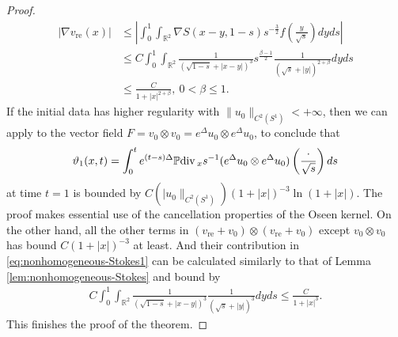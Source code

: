\documentclass[12pt]{amsart}
\renewcommand{\div}{{\rm div \thinspace }}
\numberwithin{equation}{section}              %
\theoremstyle{remark}
\begin{document}
\begin{proof}
			\begin{equation}\label{eq:decayofgradient}
				\begin{aligned}
					| \nabla v_{\textrm{re}}(x)| & \leq \left|\int_0^1 \int_{\mathbb{R}^2} \nabla S(x-y,1-s)  s^{-\frac{3}{2}} f\left(\frac{y}{\sqrt{s}}\right)  dy ds\right|\\
					&\leq C \int_0^1 \int_{\mathbb{R}^2}\frac{1}{(\sqrt{1-s}+|x-y|)^3} s^{\frac{\beta-1}{2}}\frac{1}{(\sqrt{s}+|y|)^{2+\beta}} dy ds\\
					& \leq \frac{C}{1+|x|^{2+\beta}}, ~ 0<\beta \leq 1.
				\end{aligned}						
			\end{equation}
			If the initial data has higher regularity with $\|u_0\|_{C^2(S^1)}<+\infty$, then
			we can apply \cite[Lemma 4]{Brandolese09} to the vector field $F=v_0\otimes v_0= e^{\Delta}u_0\otimes e^{\Delta}u_0$, to  conclude that
			\begin{equation*}
				\vartheta_1(x,t) = \int_0^t   e^{(t-s)\Delta} \mathbb{P} \div_x s^{-1} (e^{\Delta}u_0\otimes e^{\Delta}u_0)\left(\frac{\cdot}{\sqrt{s}}\right) ds
			\end{equation*}
			at time $t=1$	is bounded by $C(|u_0\|_{C^2(S^1)})(1+|x|)^{-3}\ln(1+|x|)$. The proof  makes essential use of the cancellation properties of the Oseen kernel.
			On the other hand, all the other terms in $(v_{\textrm{re}} + v_0)\otimes(v_{\textrm{re}} + v_0)$ except $v_0\otimes v_0$ has bound $C(1+|x|)^{-3}$ at least. And their contribution in \eqref{eq:nonhomogeneous-Stokes1} can be calculated similarly to that of Lemma \ref{lem:nonhomogeneous-Stokes} and bound by 
			\begin{equation*}
				\begin{aligned}
					C \int_0^1 \int_{\mathbb{R}^2}\frac{1}{(\sqrt{1-s}+|x-y|)^3} \frac{1}{(\sqrt{s}+|y|)^3} dy ds
					\leq \frac{C}{1+|x|^3}.
				\end{aligned}						
			\end{equation*}
            This finishes the proof of the theorem.
		\end{proof}
		
		
		
		
		
		
		
		
\end{document}
